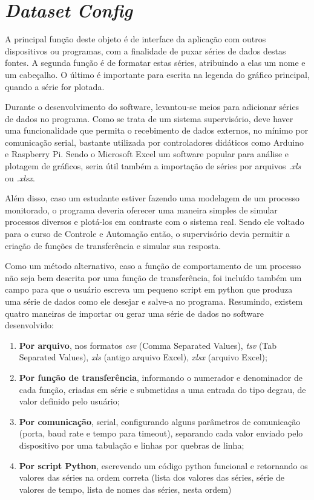\section{\emph{Dataset Config}}

A principal função deste objeto é de interface da aplicação com outros dispositivos ou programas, com a finalidade de puxar séries de dados destas fontes. A segunda função é de formatar estas séries, atribuindo a elas um nome e um cabeçalho. O último é importante para escrita na legenda do gráfico principal, quando a série for plotada.

Durante o desenvolvimento do software, levantou-se meios para adicionar séries de dados no programa. Como se trata de um sistema supervisório, deve haver uma funcionalidade que permita o recebimento de dados externos, no mínimo por comunicação serial, bastante utilizada por controladores didáticos como Arduino e Raspberry Pi. Sendo o Microsoft Excel um software popular para análise e plotagem de gráficos, seria útil também a importação de séries por arquivos \emph{.xls} ou \emph{.xlsx}. 

Além disso, caso um estudante estiver fazendo uma modelagem de um processo monitorado, o programa deveria oferecer uma maneira simples de simular processos diversos e plotá-los em contraste com o sistema real. Sendo ele voltado para o curso de Controle e Automação então, o supervisório devia permitir a criação de funções de transferência e simular sua resposta.

Como um método alternativo, caso a função de comportamento de um processo não seja bem descrita por uma função de transferência, foi incluído também um campo para que o usuário escreva um pequeno script em python que produza uma série de dados como ele desejar e salve-a no programa.
Resumindo, existem quatro maneiras de importar ou gerar uma série de dados no software desenvolvido:

\begin{enumerate}
	\item \textbf{Por arquivo}, nos formatos \emph{csv} (Comma Separated Values), \emph{tsv} (Tab Separated Values), \emph{xls} (antigo arquivo Excel), \emph{xlsx} (arquivo Excel);
	\item \textbf{Por função de transferência}, informando o numerador e denominador de cada função, criadas em série e submetidas a uma entrada do tipo degrau, de valor definido pelo usuário;
	\item \textbf{Por comunicação}, serial, configurando alguns parâmetros de comunicação (porta, baud rate e tempo para timeout), separando cada valor enviado pelo dispositivo por uma tabulação e linhas por quebras de linha;
	\item \textbf{Por script Python}, escrevendo um código python funcional e retornando os valores das séries na ordem correta (lista dos valores das séries, série de valores de tempo, lista de nomes das séries, nesta ordem)
\end{enumerate}

